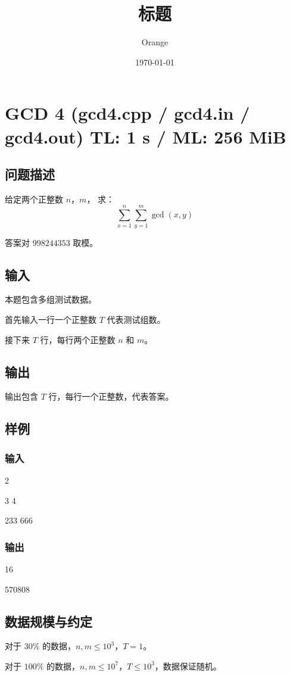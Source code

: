 \documentclass[UTF8]{article}
\title{标题}
\author{Orange}
\date{\today}
\begin{document}
	\heiti

	\section{GCD 4 \small(gcd4.cpp / gcd4.in / gcd4.out) TL: 1 s / ML: 256 MiB}
	\subsection{问题描述}
	给定两个正整数 $n$，$m$，
	求：
	$$
	\sum_{x = 1}^{n} \sum_{y = 1}^{m} \gcd(x, y)
	$$

	答案对 $998244353$ 取模。

	\subsection{输入}
	本题包含多组测试数据。

	首先输入一行一个正整数 $T$ 代表测试组数。

	接下来 $T$ 行，每行两个正整数 $n$ 和 $m$。

	\subsection{输出}
	输出包含 $T$ 行，每行一个正整数，代表答案。

	\subsection{样例}
	\subsubsection{输入}
	2

	3 4

	233 666

	\subsubsection{输出}
	16

	570808

	\subsection{数据规模与约定}
	对于 $30\%$ 的数据，$n, m \le 10^3$，$T = 1$。

	对于 $100\%$ 的数据，$n, m \le 10^7$，$T \le 10^3$，数据保证随机。
\end{document}
